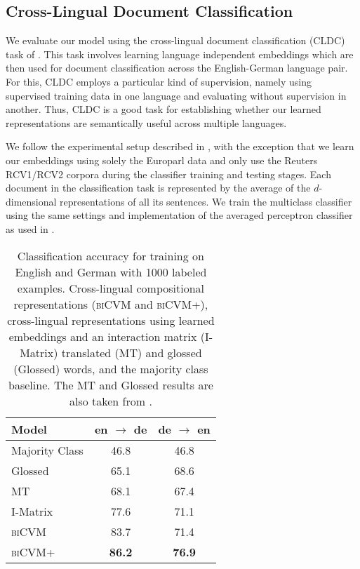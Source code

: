 \documentclass{article} \pdfoutput=1
\newcommand{\biCVM}{\textsc{biCVM}\xspace}
\newcommand{\biCVMplus}{\textsc{biCVM+}\xspace}
\begin{document}
\subsection{Cross-Lingual Document Classification}

We evaluate our model using the cross-lingual document classification (CLDC)
task of \citet{Klementiev:2012}.  This task involves learning language
independent embeddings which are then used for document classification across
the English-German language pair.  For this, CLDC employs a particular kind of
supervision, namely using supervised training data in one language and
evaluating without supervision in another.  Thus, CLDC is a good task for
establishing whether our learned representations are semantically useful across
multiple languages.

We follow the experimental setup described in \cite{Klementiev:2012}, with the
exception that we learn our embeddings using solely the Europarl data and only
use the Reuters RCV1/RCV2 corpora during the classifier training and testing
stages.  Each document in the classification task is represented by the average
of the $d$-dimensional representations of all its sentences.  We train the
multiclass classifier using the same settings and implementation of the averaged
perceptron classifier \cite{Collins:2002} as used in \cite{Klementiev:2012}.

\begin{table}[t]
\centering
\begin{tabular}{lcc}
Model & en $\rightarrow$ de & de $\rightarrow$ en \\ \hline
Majority Class & 46.8 & 46.8 \\
Glossed & 65.1 & 68.6 \\
MT & 68.1 & 67.4 \\
I-Matrix & 77.6 & 71.1 \\ \hline
\biCVM & 83.7 & 71.4 \\
\biCVMplus & \textbf{86.2} & \textbf{76.9} \\
\end{tabular}
\caption{Classification accuracy for training on English and German with 1000
  labeled examples. Cross-lingual compositional representations (\biCVM and
  \biCVMplus), cross-lingual representations using learned embeddings and an
  interaction matrix (I-Matrix) \cite{Klementiev:2012} translated (MT) and
  glossed (Glossed) words, and the majority class baseline. The MT and Glossed
  results are also taken from \citet{Klementiev:2012}.}
\label{tab:results1k}
\end{table}
\end{document}
